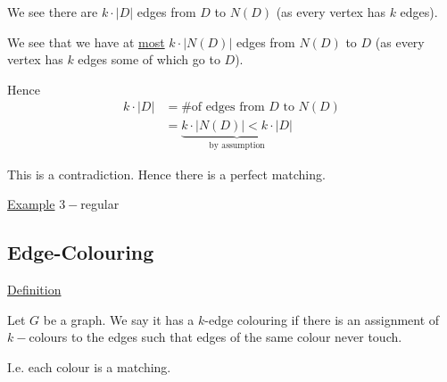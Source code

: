 \documentclass{article}
\begin{document}
We see there are $k \cdot |D|$ edges from $D$ to $N(D)$ (as every vertex has $k$ edges). 

We see that we have at \underline{most} $k \cdot |N(D)|$ edges from $N(D)$ to $D$ (as every vertex has $k$ edges some of which go to $D$). 

Hence
\begin{align*}
    k \cdot |D| &= \# \text{of edges from } D \text{ to } N(D) \\
    &= \underbrace{k \cdot |N(D)| < k \cdot |D|}_{\text{by assumption}}
\end{align*}

This is a contradiction. Hence there is a perfect matching.

\underline{Example} $3-$regular

\begin{center}
\end{center}

\subsection{Edge-Colouring}

\underline{Definition}

Let $G$ be a graph. We say it has a $k$-edge colouring if there is an assignment of $k-$colours to the edges such that edges of the same colour never touch. 

I.e. each colour is a matching.
\end{document}
